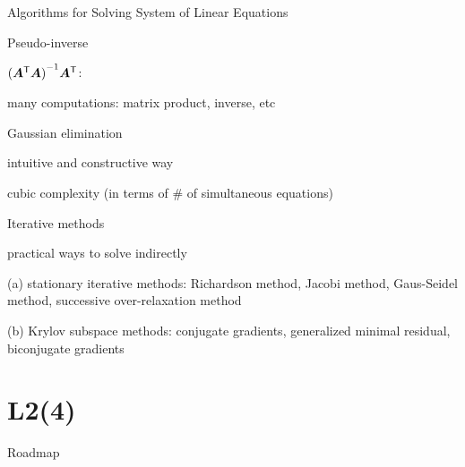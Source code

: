 \documentclass[fleqn,aspectratio=169]{beamer}
\begin{document}
\begin{frame}{Algorithms for Solving System of Linear Equations} 

\plitemsep 0.05in

\bce
\item Pseudo-inverse
\vspace{-0.6cm}
\bci
\item ${{({\bm{A}}^{\mathsf{T}} \bm{A})}^{-1}} {\bm{A}}^{\mathsf{T}}$: 
\item many computations: matrix product, inverse, etc
\eci

\item Gaussian elimination
\bci
\item intuitive and constructive way
\item cubic complexity (in terms of \# of simultaneous equations)
\eci

\item Iterative methods
\bci
\item practical ways to solve indirectly

\item[(a)] stationary iterative methods: Richardson method, Jacobi method, Gaus-Seidel method, successive over-relaxation method
\item[(b)] Krylov subspace methods: conjugate gradients, generalized minimal residual, biconjugate gradients  
\eci

\ece
\end{frame}


\section{L2(4)}
\begin{frame}{Roadmap}

\plitemsep 0.1in

\bce[(1)] 
\item {}

\item {}

\item {}
\ece
\end{frame}
\end{document}
